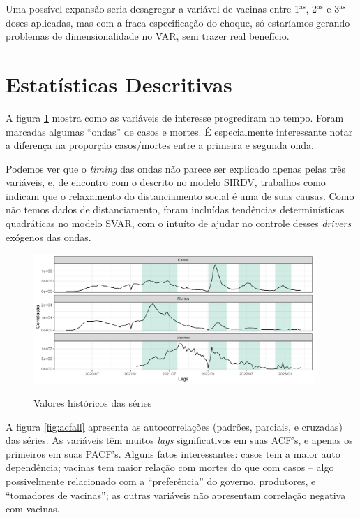 \documentclass[
    article,
	12pt,				%
	oneside,			%
	a4paper,			%
	english,			%
	brazil,				%
	hyperref = {colorlinks, citecolor=c1d, linkcolor=c2d, urlcolor=c3d, colorlinks}
	]{abntex2}
\newcounter{j}
\begin{document}
Uma possível expansão seria desagregar a variável de vacinas entre 1$^\text{as}$, 2$^\text{as}$ e 3$^\text{as}$ doses aplicadas, mas com a fraca especificação do choque, só estaríamos gerando problemas de dimensionalidade no VAR, sem trazer real benefício.


\section{Estatísticas Descritivas}\label{sec:stat}

A figura \ref{fig:histval} mostra como as variáveis de interesse progrediram no tempo. Foram marcadas algumas ``ondas'' de casos e mortes. É especialmente interessante notar a diferença na proporção casos$/$mortes entre a primeira e segunda onda.

Podemos ver que o \textit{timing} das ondas não parece ser explicado apenas pelas três variáveis, e, de encontro com o descrito no modelo SIRDV, trabalhos como \textcite{Moraes2021} indicam que o relaxamento do distanciamento social é uma de suas causas. Como não temos dados de distanciamento, foram incluídas tendências determinísticas quadráticas no modelo SVAR, com o intuíto de ajudar no controle desses \textit{drivers} exógenos das ondas.

\begin{figure}[H]
    \centering
    \caption{Valores históricos das séries}
    \includegraphics[width = 0.95\textwidth]{Figures/stat_historic.png}
    \label{fig:histval}
\end{figure}

A figura \ref{fig:acfall} apresenta as autocorrelações (padrões, parciais, e cruzadas) das séries. As variáveis têm muitos \textit{lags} significativos em suas ACF's, e apenas os primeiros em suas PACF's. Alguns fatos interessantes: casos tem a maior auto dependência; vacinas tem maior relação com mortes do que com casos -- algo possivelmente relacionado com a ``preferência'' do governo, produtores, e ``tomadores de vacinas''; as outras variáveis não apresentam correlação negativa com vacinas.
\end{document}
